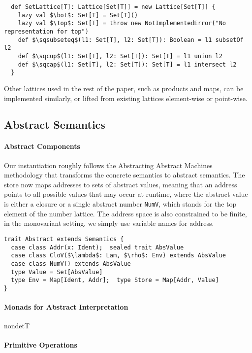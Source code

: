 \begin{lstlisting}
  def SetLattice[T]: Lattice[Set[T]] = new Lattice[Set[T]] {
    lazy val $\bot$: Set[T] = Set[T]()
    lazy val $\top$: Set[T] = throw new NotImplementedError("No representation for top")
    def $\sqsubseteq$(l1: Set[T], l2: Set[T]): Boolean = l1 subsetOf l2
    def $\sqcup$(l1: Set[T], l2: Set[T]): Set[T] = l1 union l2
    def $\sqcap$(l1: Set[T], l2: Set[T]): Set[T] = l1 intersect l2
  }
\end{lstlisting}

Other lattices used in the rest of the paper, such as products and maps, can be
implemented similarly, or lifted from existing lattices element-wise or point-wise.

\subsection{Abstract Semantics}

\paragraph{Abstract Components}

Our instantiation roughly follows the Abstracting Abstract Machines methodology
\cite{DBLP:conf/icfp/HornM10, DBLP:journals/jfp/HornM12} that transforms the
concrete semantics to abstract semantics. The store now maps addresses to sets
of abstract values, meaning that an address points to all possible values that
may occur at runtime, where the abstract value is either a closure or a single
abstract number \texttt{NumV}, which stands for the top element of the number
lattice. The address space is also constrained to be finite, in the monovariant
setting, we simply use variable names for address.

\begin{lstlisting}
trait Abstract extends Semantics {
  case class Addr(x: Ident);  sealed trait AbsValue
  case class CloV($\lambda$: Lam, $\rho$: Env) extends AbsValue
  case class NumV() extends AbsValue
  type Value = Set[AbsValue]
  type Env = Map[Ident, Addr];  type Store = Map[Addr, Value]
}
\end{lstlisting}

\paragraph{Monads for Abstract Interpretation} nondetT

\paragraph{Primitive Operations}

